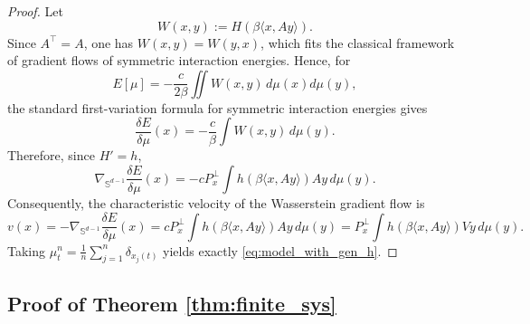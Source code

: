\documentclass[10pt]{article}
\theoremstyle{definition}
\theoremstyle{definition}
\numberwithin{equation}{section}
\begin{document}
\begin{proof}
Let
\[
    W(x,y):=H(\beta\langle x,Ay\rangle).
\]
Since $A^\top=A$, one has $W(x,y)=W(y,x)$, which fits the classical framework of gradient flows of symmetric interaction energies. Hence, for
\[
    E[\mu]
    =
    -\frac{c}{2\beta}
    \iint W(x,y)\,d\mu(x)d\mu(y),
\]
the standard first-variation formula for symmetric interaction energies gives
\[
    \frac{\delta E}{\delta\mu}(x)
    =
    -\frac{c}{\beta}
    \int W(x,y)\,d\mu(y).
\]
Therefore, since $H'=h$,
\[
    \nabla_{\mathbb S^{d-1}}
    \frac{\delta E}{\delta\mu}(x)
    =
    -cP_x^\perp
    \int h(\beta\langle x,Ay\rangle)Ay\,d\mu(y).
\]
Consequently, the characteristic velocity of the Wasserstein gradient flow is
\[
    v(x)
    =
    -\nabla_{\mathbb S^{d-1}}
    \frac{\delta E}{\delta\mu}(x)
    =
    cP_x^\perp
    \int h(\beta\langle x,Ay\rangle)Ay\,d\mu(y)=P_x^\perp
    \int h(\beta\langle x,Ay\rangle)Vy\,d\mu(y).
\]
Taking $\mu_t^n=\frac1n\sum_{j=1}^n\delta_{x_j(t)}$ yields exactly \eqref{eq:model_with_gen_h}.
\end{proof}

\subsection{Proof of Theorem \ref{thm:finite_sys}}\label{app:finite_sys}
\end{document}

